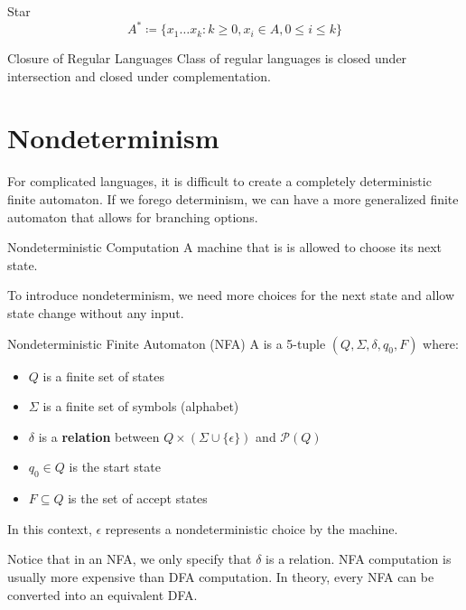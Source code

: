 \documentclass[12pt]{report}
\begin{document}
\begin{dfnbox}{Star}{}
    \[ A^* \coloneq \{ x_1 \ldots x_k : k \geq 0, x_i \in A, 0 \leq i \leq k \} \]
\end{dfnbox}

\begin{thmbox}{Closure of Regular Languages}{}
    Class of regular languages is closed under intersection and closed under complementation.
\end{thmbox}

\section{Nondeterminism}

For complicated languages, it is difficult to create a completely deterministic finite automaton. If we forego determinism, we can have a more generalized finite automaton that allows for branching options.

\begin{dfnbox}{Nondeterministic Computation}{}
    A machine that is  is allowed to choose its next state.
\end{dfnbox}

To introduce nondeterminism, we need more choices for the next state and allow state change without any input.

\begin{dfnbox}{Nondeterministic Finite Automaton (NFA)}{}
    A  is a 5-tuple $(Q, \Sigma, \delta, q_0, F)$ where:
    \begin{itemize}[noitemsep]
        \item $Q$ is a finite set of states
        \item $\Sigma$ is a finite set of symbols (alphabet)
        \item $\delta$ is a \textbf{relation} between $Q \times (\Sigma \cup \{ \epsilon\})$ and $\mathcal{P}(Q)$
        \item $q_0 \in Q$ is the start state
        \item $F \subseteq Q$ is the set of accept states
    \end{itemize}
    In this context, $\epsilon$ represents a nondeterministic choice by the machine.
\end{dfnbox}

Notice that in an NFA, we only specify that $\delta$ is a relation. NFA computation is usually more expensive than DFA computation. In theory, every NFA can be converted into an equivalent DFA.
\end{document}
